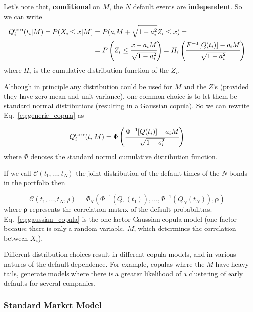 Let's note that, \textbf{conditional} on $M$, the $N$ default events are \textbf{independent}. So we can write
\begin{equation}
\begin{split}
Q_i^{\textrm{corr}}(t_i|M) = P(X_i\le x|M) &= P(a_i M + \sqrt{1-a_i^2}Z_i\le x) =\\
&= P\left(Z_i\le \cfrac{x-a_i M}{\sqrt{1-a_i^2}}\right)
=H_i\left(\cfrac{F^{-1}[Q(t_i)]-a_i M}{\sqrt{1-a_i^2}}\right)
\end{split}
\label{eq:generic_copula}
\end{equation}
where $H_i$ is the cumulative distribution function of the $Z_i$.

Although in principle any distribution could be used for \(M\) and the \(Z\)'s (provided they have zero mean and unit variance), one common choice is to let them be standard normal distributions (resulting in a Gaussian copula).
So we can rewrite Eq.~\ref{eq:generic_copula} as

\begin{equation}
Q_i^{\textrm{corr}}(t_i|M) = \Phi\left(\cfrac{\Phi^{-1}[Q(t_i)]-a_i M}{\sqrt{1-a_i^2}}\right)
\label{eq:gaussian_one_factor_copula}
\end{equation}
where $\Phi$ denotes the standard normal cumulative distribution function.

If we call $\mathcal{C}(t_1,\ldots,t_N)$ the joint distribution of the default times of the $N$ bonds in the portfolio then

\begin{equation}
\mathcal{C}(t_1,\ldots,t_N, \rho)=\Phi_{N}(\Phi^{-1}(Q_1(t_1)),\ldots,\Phi^{-1}(Q_N(t_N)), \boldsymbol{\rho})
\label{eq:gaussian_copula}
\end{equation}
where $\boldsymbol{\rho}$ represents the correlation matrix of the default probabilities. Eq.~\ref{eq:gaussian_copula} is the one factor Gaussian copula model (one factor because there is only a random variable, $M$, which determines the correlation between $X_i$).

Different distribution choices result in different copula models, and in various natures of the default dependence. For example, copulas where the \(M\) have heavy tails, generate models where there is a greater likelihood of a clustering of early defaults for several companies.

\subsubsection{Standard Market Model}
\label{standard-market-model}

